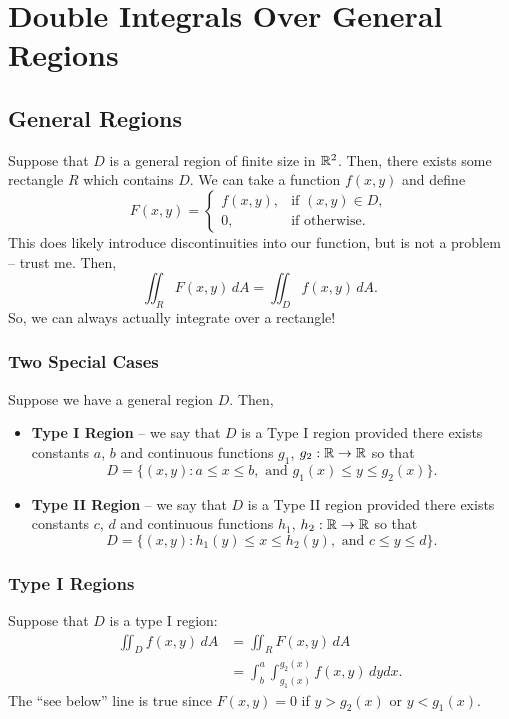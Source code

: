 \newpage

\section{Double Integrals Over General Regions}

\subsection{General Regions}

Suppose that \(D\) is a general region of finite size in \(\mathbb{R}^2\). Then, there exists some rectangle \(R\) which contains \(D\). We can take a function \(f(x, y)\) and define
\[
  F(x, y) =
  \begin{cases}
    f(x, y), & \text{if } (x, y) \in D, \\ 0, & \text{if otherwise}.
  \end{cases}
\]
This does likely introduce discontinuities into our function, but is not a problem – trust me. Then,
\[
  \iint_R F(x, y) \, dA = \iint_D f(x, y) \, dA.
\]
So, we can always actually integrate over a rectangle!

\subsubsection{Two Special Cases}

Suppose we have a general region \(D\). Then,
\begin{itemize}
  \item \textbf{Type I Region} – we say that \(D\) is a Type I region provided there exists constants \(a\), \(b\) and continuous functions \(g_1\), \(g_2 : \mathbb{R} \to \mathbb{R}\) so that
        \[
          D = \{(x, y) : a \leq x \leq b, \text{ and } g_1(x) \leq y \leq g_2(x)\}.
        \]
  \item \textbf{Type II Region} – we say that \(D\) is a Type II region provided there exists constants \(c\), \(d\) and continuous functions \(h_1\), \(h_2 : \mathbb{R} \to \mathbb{R}\) so that
        \[
          D = \{(x, y) : h_1(y) \leq x \leq h_2(y), \text{ and } c \leq y \leq d\}.
        \]
\end{itemize}
\subsubsection{Type I Regions}

Suppose that \(D\) is a type I region:
\begin{align*}
  \iint_D f(x, y) \, dA & = \iint_R F(x, y) \, dA                             \\
                        & = \int_b^a \int_{g_1(x)}^{g_2(x)} f(x, y) \, dy dx.
\end{align*}
The ``see below'' line is true since \(F(x, y) = 0\) if \(y > g_2(x)\) or \(y < g_1(x)\).

